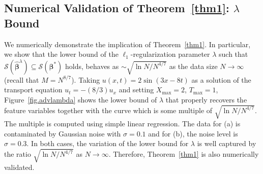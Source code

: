 \documentclass[a4paper,11pt]{article}
\newcommand{\bbeta}{\bm{\beta}}
\begin{document}
\subsection{Numerical Validation of Theorem~\ref{thm1}: $\lambda$ Bound}
We numerically demonstrate the implication of Theorem~\ref{thm1}. In particular, we show that the lower bound of the $\ell_1$-regularization parameter $\lambda$ such that $\mathcal{S}(\widehat{\bbeta}^\lambda)\subseteq\mathcal{S}(\bbeta^*)$ holds, behaves as $\sim\sqrt{\ln N/N^{4/7}}$ as the data size $N\to \infty$ (recall that $M=N^{8/7}$). Taking $u(x,t)=2\sin(3x-8t)$ as a solution of the transport equation $u_t=-(8/3)u_x$ and setting $X_{\max}=2$, $T_{\max}=1$,  Figure~\ref{fig.advlambda} shows the lower bound of $\lambda$ that properly recovers the feature variables together with the curve which is some multiple of $\sqrt{\ln N/N^{4/7}}$. The multiple is computed using simple linear regression. The data for (a) is contaminated by Gaussian noise with $\sigma=0.1$ and for (b), the noise level is $\sigma=0.3$. In both cases, the variation of the lower bound for $\lambda$ is well captured by the ratio $\sqrt{\ln N/N^{4/7}}$ as $N\to\infty$. Therefore, Theorem~\ref{thm1} is also numerically validated. 
\end{document}
